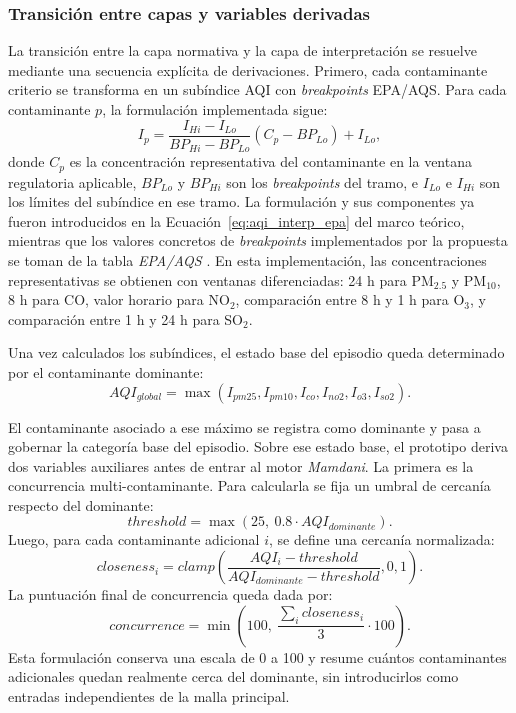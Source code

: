 \subsubsection{Transición entre capas y variables derivadas}
La transición entre la capa normativa y la capa de interpretación se resuelve mediante una secuencia explícita de derivaciones. Primero, cada contaminante criterio se transforma en un subíndice AQI con \textit{breakpoints} EPA/AQS. Para cada contaminante \(p\), la formulación implementada sigue:
\begin{equation}
I_p=\frac{I_{Hi}-I_{Lo}}{BP_{Hi}-BP_{Lo}}\left(C_p-BP_{Lo}\right)+I_{Lo},
\end{equation}
donde \(C_p\) es la concentración representativa del contaminante en la ventana regulatoria aplicable, \(BP_{Lo}\) y \(BP_{Hi}\) son los \textit{breakpoints} del tramo, e \(I_{Lo}\) e \(I_{Hi}\) son los límites del subíndice en ese tramo. La formulación y sus componentes ya fueron introducidos en la Ecuación~\ref{eq:aqi_interp_epa} del marco teórico, mientras que los valores concretos de \textit{breakpoints} implementados por la propuesta se toman de la tabla \textit{EPA/AQS} \cite{DATA_EPA_AQS_BREAKPOINTS}. En esta implementación, las concentraciones representativas se obtienen con ventanas diferenciadas: 24 h para PM$_{2.5}$ y PM$_{10}$, 8 h para CO, valor horario para NO$_2$, comparación entre 8 h y 1 h para O$_3$, y comparación entre 1 h y 24 h para SO$_2$.

Una vez calculados los subíndices, el estado base del episodio queda determinado por el contaminante dominante:
\begin{equation}
AQI_{global}=\max\left(I_{pm25},I_{pm10},I_{co},I_{no2},I_{o3},I_{so2}\right).
\end{equation}

El contaminante asociado a ese máximo se registra como dominante y pasa a gobernar la categoría base del episodio. Sobre ese estado base, el prototipo deriva dos variables auxiliares antes de entrar al motor \textit{Mamdani}. La primera es la concurrencia multi-contaminante. Para calcularla se fija un umbral de cercanía respecto del dominante:
\begin{equation}
threshold=\max\left(25,\ 0.8\cdot AQI_{dominante}\right).
\end{equation}
Luego, para cada contaminante adicional \(i\), se define una cercanía normalizada:
\begin{equation}
closeness_i=clamp\left(\frac{AQI_i-threshold}{AQI_{dominante}-threshold},0,1\right).
\end{equation}
La puntuación final de concurrencia queda dada por:
\begin{equation}
concurrence=\min\left(100,\ \frac{\sum_i closeness_i}{3}\cdot 100\right).
\end{equation}
Esta formulación conserva una escala de 0 a 100 y resume cuántos contaminantes adicionales quedan realmente cerca del dominante, sin introducirlos como entradas independientes de la malla principal.


